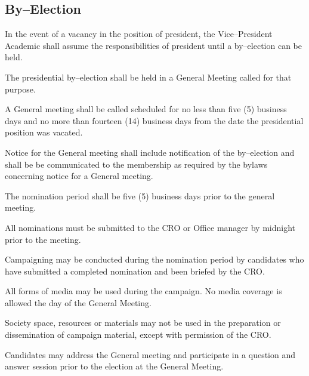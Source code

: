 \subsection {By--Election}
\begin{longenum}[ label*=\thesubsection.\arabic*., align=left]
	\item In the event of a vacancy in the position of president, the Vice--President Academic shall assume the responsibilities of president until a by--election can be held.
	\item The presidential by--election shall be held in a General Meeting called for that purpose.
	\item A General meeting shall be called scheduled for no less than five (5) business days and no more than fourteen (14) business days from the date the presidential position was vacated. 
	\item Notice for the General meeting shall include notification of the by--election and shall be be communicated to the membership as required by the bylaws concerning notice for a General meeting.
	\item The nomination period shall be five (5) business days prior to the general meeting.
	\item All nominations must be submitted to the CRO or Office manager by midnight prior to the meeting.
	\item Campaigning may be conducted during the nomination period by candidates who have submitted a completed nomination and been briefed by the CRO.
	\item All forms of media may be used during the campaign. No media coverage is allowed the day of the General Meeting.  
	\item Society space, resources or materials may not be used in the preparation or dissemination of campaign material, except with permission of the CRO.
	\item Candidates may address the General meeting and participate in a question and answer session prior to the election at the General Meeting.

\end{longenum}
